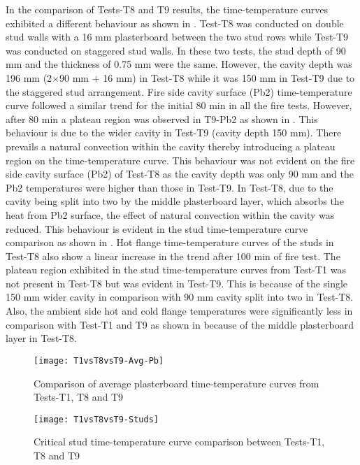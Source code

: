 In the comparison of Tests-T8 and T9 results, the time-temperature curves exhibited a different behaviour as shown in . Test-T8 was conducted on double stud walls with a 16 mm plasterboard between the two stud rows while Test-T9 was conducted on staggered stud walls. In these two tests, the stud depth of 90 mm and the thickness of 0.75 mm were the same. However, the cavity depth was 196 mm (2\(\times\)90 mm \(+\) 16 mm) in Test-T8 while it was 150 mm in Test-T9 due to the staggered stud arrangement. Fire side cavity surface (Pb2) time-temperature curve followed a similar trend for the initial 80 min in all the fire tests. However, after 80 min a plateau region was observed in T9-Pb2 as shown in . This behaviour is due to the wider cavity in Test-T9 (cavity depth 150 mm). There prevails a natural convection within the cavity thereby introducing a plateau region on the time-temperature curve. This behaviour was not evident on the fire side cavity surface (Pb2) of Test-T8 as the cavity depth was only 90 mm and the Pb2 temperatures were higher than those in Test-T9. In Test-T8, due to the cavity being split into two by the middle plasterboard layer, which absorbs the heat from Pb2 surface, the effect of natural convection within the cavity was reduced. This behaviour is evident in the stud time-temperature curve comparison as shown in . Hot flange time-temperature curves of the studs in Test-T8 also show a linear increase in the trend after 100 min of fire test. The plateau region exhibited in the stud time-temperature curves from Test-T1 was not present in Test-T8 but was evident in Test-T9. This is because of the single 150 mm wider cavity in comparison with 90 mm cavity split into two in Test-T8. Also, the ambient side hot and cold flange temperatures were significantly less in comparison with Test-T1 and T9 as shown in  because of the middle plasterboard layer in Test-T8.
\begin{figure}[!htbp]
	\centering
		\texttt{[image: T1vsT8vsT9-Avg-Pb]}  
	\caption{Comparison of average plasterboard time-temperature curves from Tests-T1, T8 and T9}
	\label{fig:T1vsT8vsT9-Avg-Pb}
\end{figure}
\begin{figure}[!htbp]
	\centering
		\texttt{[image: T1vsT8vsT9-Studs]}  
	\caption{Critical stud time-temperature curve comparison between Tests-T1, T8 and T9}
	\label{fig:T1vsT8vsT9-Studs}
\end{figure}
 
